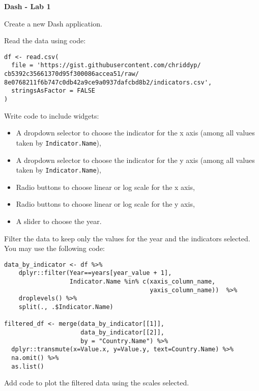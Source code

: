 \documentclass[letterpaper, 12pt]{article}
\begin{document}
\begin{center}
\textbf{\Large{Dash - Lab 1}}
\end{center}

\vspace{2em}

Create a new Dash application.

\vspace{1em}

Read the data using code:

\begin{verbatim}
df <- read.csv(
  file = 'https://gist.githubusercontent.com/chriddyp/
cb5392c35661370d95f300086accea51/raw/
8e0768211f6b747c0db42a9ce9a0937dafcbd8b2/indicators.csv',
  stringsAsFactor = FALSE
)
\end{verbatim}

Write code to include widgets:
\begin{itemize}
	\item A dropdown selector to choose the indicator for the x axis (among all values taken by \verb|Indicator.Name|),
	\item A dropdown selector to choose the indicator for the y axis (among all values taken by \verb|Indicator.Name|),
	\item Radio buttons to choose linear or log scale for the x axis,
	\item Radio buttons to choose linear or log scale for the y axis,
	\item A slider to choose the year.
\end{itemize}

\vspace{1em}

Filter the data to keep only the values for the year and the indicators selected. You may use the following code:

\begin{verbatim}
data_by_indicator <- df %>%
    dplyr::filter(Year==years[year_value + 1],
                  Indicator.Name %in% c(xaxis_column_name,
                                        yaxis_column_name))  %>%
    droplevels() %>%
    split(., .$Indicator.Name)
    
filtered_df <- merge(data_by_indicator[[1]],
                     data_by_indicator[[2]],
                     by = "Country.Name") %>%
  dplyr::transmute(x=Value.x, y=Value.y, text=Country.Name) %>%
  na.omit() %>%
  as.list()
\end{verbatim}

\vspace{1em}

Add code to plot the filtered data using the scales selected.
 
\end{document}
